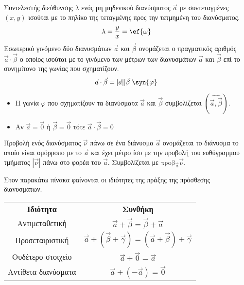 \documentclass[twoside,nofonts,internet,shmeiwseis]{thewria}
\begin{document}
Συντελεστής διεύθυνσης $ \lambda $ ενός μη μηδενικού διανύσματος $ \vec{a} $ με συντεταγμένες $ (x,y) $ ισούται με το πηλίκο της τεταγμένης προς την τετμημένη του διανύσματος.
\[ \lambda=\frac{y}{x}=\ef{\omega} \]
Εσωτερικό γινόμενο δύο διανυσμάτων $ \vec{a} $ και $ \vec{\beta} $ ονομάζεται ο πραγματικός αριθμός $ \vec{a}\cdot\vec{\beta} $ ο οποίος ισούται με το γινόμενο των μέτρων των διανυσμάτων $ \vec{a} $ και $ \vec{\beta} $ επί το συνημίτονο της γωνίας που σχηματίζουν.
\[ \vec{a}\cdot\vec{\beta}=|\vec{a}||\vec{\beta}|\syn{\varphi} \]
\begin{itemize}
\item Η γωνία $ \varphi $ που σχηματίζουν τα διανύσματα $ \vec{a} $ και $ \vec{\beta} $ συμβολίζεται $ ( \widehat{\vec{a}, \vec{\beta}})  $.
\item Αν $ \vec{a}=\vec{0} $ ή $ \vec{\beta}=\vec{0} $ τότε $ \vec{a}\cdot\vec{\beta}=0 $
\end{itemize}
Προβολή ενός διανύσματος $ \vec{\nu} $ πάνω σε ένα διάνυσμα $ \vec{a} $ ονομάζεται το διάνυσμα το οποίο είναι ομόρροπο με το $ \vec{a} $ και έχει μέτρο ίσο με την προβολή του ευθύγραμμου τμήματος $ |\vec{\nu}| $ πάνω στο φορέα του $ \vec{a} $. Συμβολίζεται με $ \textrm{προβ}_{\vec{a}}{\vec{\nu}} $.
\begin{center}
\end{center}
\thewrhmata
{}
Στον παρακάτω πίνακα φαίνονται οι ιδιότητες της πράξης της πρόσθεσης διανυσμάτων.\\
\begin{center}
\begin{tabular}{cc}
\hline \rule[-2ex]{0pt}{5.5ex} \textbf{Ιδιότητα} & \textbf{Συνθήκη}  \\ 
\hhline{==} \rule[-2ex]{0pt}{5.5ex} Αντιμεταθετική & $ \vec{a}+\vec{\beta}=\vec{\beta}+\vec{a} $  \\ 
 \rule[-2ex]{0pt}{5.5ex} Προσεταιριστική & $ \vec{a}+\left( \vec{\beta}+\vec{\gamma}\right) =\left( \vec{a}+\vec{\beta}\right) +\vec{\gamma} $  \\ 
 \rule[-2ex]{0pt}{5.5ex} Ουδέτερο στοιχείο & $ \vec{a}+\vec{0}=\vec{a} $  \\ 
  \rule[-2ex]{0pt}{5.5ex} Αντίθετα διανύσματα & $ \vec{a}+(-\vec{a})=\vec{0} $  \\
\hline 
\end{tabular}
\end{center}
\end{document}
